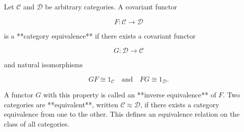 Let $\mathcal{C}$ and $\mathcal{D}$ be arbitrary categories. A covariant functor

$$F: \mathcal{C} \to \mathcal{D}$$

is a **category equivalence** if there exists a covariant functor

$$G: \mathcal{D} \to \mathcal{C}$$

and natural isomorphisms

$$GF \cong 1_{\mathcal{C}} \quad \text{and} \quad FG \cong 1_{\mathcal{D}}.$$

A functor $G$ with this property is called an **inverse equivalence** of $F$. Two categories are **equivalent**, written $\mathcal{C} \approx \mathcal{D}$, if there exists a category equivalence from one to the other. This defines an equivalence relation on the class of all categories.
